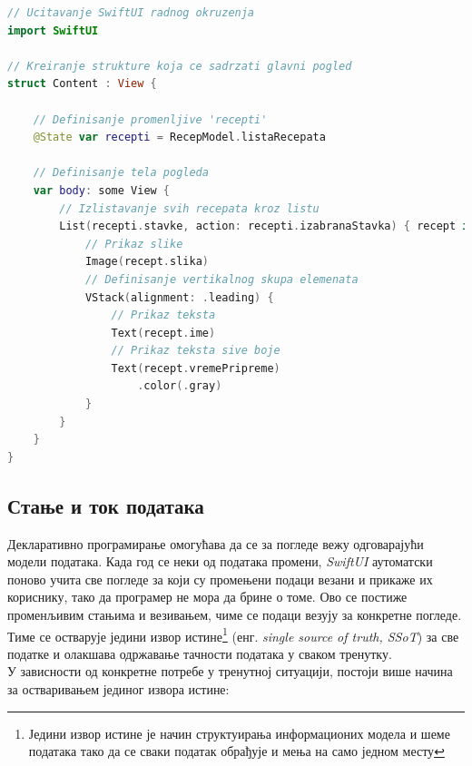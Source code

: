 \documentclass[12pt,oneside]{memoir}
\begin{document}
\begin{lstlisting}[caption=\textit{{Пример SwiftUI кода}}, label={lst:Пример SwiftUI кода}, language=Swift, frame=single]
// Ucitavanje SwiftUI radnog okruzenja
import SwiftUI

// Kreiranje strukture koja ce sadrzati glavni pogled
struct Content : View {

    // Definisanje promenljive 'recepti'
    @State var recepti = RecepModel.listaRecepata
    
    // Definisanje tela pogleda
    var body: some View {
        // Izlistavanje svih recepata kroz listu
        List(recepti.stavke, action: recepti.izabranaStavka) { recept in
            // Prikaz slike
            Image(recept.slika)
            // Definisanje vertikalnog skupa elemenata
            VStack(alignment: .leading) {
                // Prikaz teksta
                Text(recept.ime)
                // Prikaz teksta sive boje
                Text(recept.vremePripreme)
                    .color(.gray)
            }
        }
    } 
}
\end{lstlisting}

\subsection{Стање и ток података}
\label{subsec:Стање и ток података}

\indent Декларативно програмирање омогућава да се за погледе вежу одговарајући модели података. Када год се неки од података промени, \textit{SwiftUI} аутоматски поново учита све погледе за који су промењени подаци везани и прикаже их кориснику, тако да програмер не мора да брине о томе. Ово се постиже променљивим стањима и везивањем, чиме се подаци везују за конкретне погледе. Тиме се остварује једини извор истине\footnote{Једини извор истине је начин структуирања информационих модела и шеме података тако да се сваки податак обрађује и мења на само једном месту} (енг. \textit{single source of truth, SSoT}) за све податке и олакшава одржавање тачности података у сваком тренутку. 
\\
\indent У зависности од конкретне потребе у тренутној ситуацији, постоји више начина за остваривањем јединог извора истине:
\end{document}
